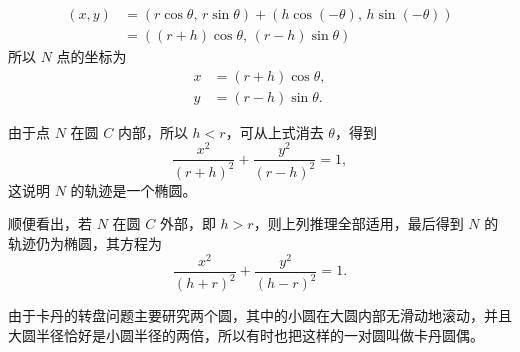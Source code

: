 \begin{align*}
  (x, y) &= (r\cos\theta,\, r\sin\theta) + (h\cos(-\theta),\, h\sin(-\theta)) \\
         &= ((r+h)\cos\theta,\, (r-h)\sin\theta)
\end{align*}
所以 $N$ 点的坐标为
\begin{align*}
  x &= (r+h)\cos\theta, \\
  y &= (r-h)\sin\theta.
\end{align*}

由于点 $N$ 在圆 $C$ 内部，所以 $h<r$，可从上式消去 $\theta$，得到
\[
  \frac{x^2}{(r+h)^2} + \frac{y^2}{(r-h)^2} = 1,
\]
这说明 $N$ 的轨迹是一个椭圆。

顺便看出，若 $N$ 在圆 $C$ 外部，即 $h>r$，则上列推理全部适用，最后得到 $N$ 的轨迹仍为椭圆，其方程为
\[
  \frac{x^2}{(h+r)^2} + \frac{y^2}{(h-r)^2} = 1.
\]

由于卡丹的转盘问题主要研究两个圆，其中的小圆在大圆内部无滑动地滚动，并且大圆半径恰好是小圆半径的两倍，所以有时也把这样的一对圆叫做卡丹圆偶。
